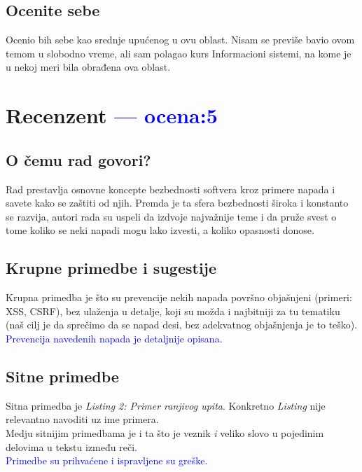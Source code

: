 \documentclass[a4paper]{report}
\newcommand{\odgovor}[1]{\textcolor{blue}{#1}}
\newcommand{\say}[1]{\textit{#1}}
\begin{document}
\section{Ocenite sebe}
Ocenio bih sebe kao srednje upućenog u ovu oblast. Nisam se previše bavio ovom temom u slobodno vreme, ali sam polagao kurs Informacioni sistemi, na kome je u nekoj meri bila obrađena ova oblast.


\chapter{Recenzent \odgovor{--- ocena:5} }


\section{O čemu rad govori?}
Rad prestavlja osnovne koncepte bezbednosti softvera kroz primere napada i savete kako se zaštiti od njih. Premda je ta sfera bezbednosti široka i konstanto se razvija, autori rada su uspeli da izdvoje najvažnije teme i da pruže svest o tome koliko se neki napadi mogu lako izvesti, a koliko opasnosti donose.

\section{Krupne primedbe i sugestije}\label{primedba}
Krupna primedba je što su prevencije nekih napada površno objašnjeni (primeri: XSS, CSRF), bez ulaženja u detalje, koji su možda i najbitniji za tu tematiku (naš cilj je da sprečimo da se napad desi, bez adekvatnog objašnjenja je to teško).\\
\odgovor{Prevencija navedenih napada je detaljnije opisana.}

\section{Sitne primedbe}
Sitna primedba je \say {Listing 2: Primer ranjivog upita}. Konkretno \say {Listing} nije relevantno navoditi uz ime primera. \\Medju sitnijim primedbama je i ta što je veznik \say{i} veliko slovo u pojedinim delovima u tekstu između reči.\\
\odgovor{Primedbe su prihvaćene i ispravljene su greške.}
\end{document}
